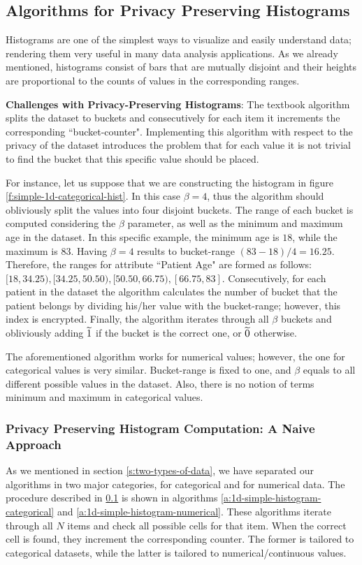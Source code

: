 \subsection{Algorithms for Privacy Preserving Histograms}\label{ss:histogram-algos}
Histograms are one of the simplest ways to visualize and easily understand data; rendering them very useful in many data analysis applications.
As we already mentioned, histograms consist of bars that are mutually disjoint and their heights are proportional to the counts of values in the corresponding ranges.

\textbf{Challenges with Privacy-Preserving Histograms}: The textbook algorithm splits the dataset to buckets and consecutively for each item it increments the corresponding ``bucket-counter".
Implementing this algorithm with respect to the privacy of the dataset introduces the problem that for each value it is not trivial to find the bucket that this specific value should be placed.

For instance, let us suppose that we are constructing the histogram in figure \ref{f:simple-1d-categorical-hist}.
In this case $\beta = 4$, thus the algorithm should obliviously split the values into four disjoint buckets.
The range of each bucket is computed considering the $\beta$ parameter, as well as the minimum and maximum age in the dataset.
In this specific example, the minimum age is $18$, while the maximum is $83$.
Having $\beta = 4$ results to bucket-range $(83 - 18) / 4 = 16.25$.
Therefore, the ranges for attribute ``Patient Age" are formed as follows: $[18, 34.25), [34.25, 50.50), [50.50, 66.75), [66.75, 83]$.
Consecutively, for each patient in the dataset the algorithm calculates the number of bucket that the patient belongs by dividing his/her value with the bucket-range; however, this index is encrypted.
Finally, the algorithm iterates through all $\beta$ buckets and obliviously adding $\widetilde{1}$ if the bucket is the correct one, or $\widetilde{0}$ otherwise.

The aforementioned algorithm works for numerical values; however, the one for categorical values is very similar.
Bucket-range is fixed to one, and $\beta$ equals to all different possible values in the dataset.
Also, there is no notion of terms minimum and maximum in categorical values.


\subsubsection{Privacy Preserving Histogram Computation: A Naive Approach}\label{sss:histogram-simple}
As we mentioned in section \ref{s:two-types-of-data}, we have separated our algorithms in two major categories, for categorical and for numerical data.
The procedure described in \ref{ss:histogram-algos} is shown in algorithms \ref{a:1d-simple-histogram-categorical} and \ref{a:1d-simple-histogram-numerical}.
These algorithms iterate through all $N$ items and check all possible cells for that item.
When the correct cell is found, they increment the corresponding counter.
The former is tailored to categorical datasets, while the latter is tailored to numerical/continuous values.

